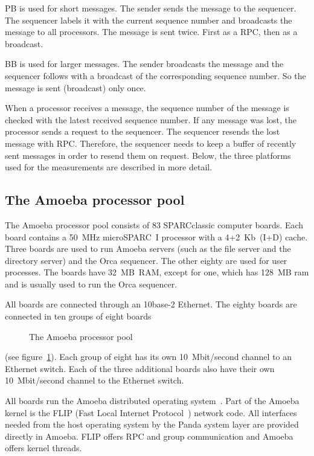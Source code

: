 \documentclass[a4paper,11pt]{article}
\begin{document}
PB is
used for short messages. The sender sends the message to the sequencer.
The sequencer labels it with the current sequence number and broadcasts
the message to all processors. The message is sent twice. First as a RPC,
then as a broadcast.

BB is used for larger messages. The sender broadcasts the message and
the sequencer follows with a broadcast of the corresponding sequence
number. So the message is sent (broadcast) only once.

When a processor receives a message, the
sequence number of the message
is checked with the latest received sequence number. If
any message was lost, the processor sends a request to the sequencer. The
sequencer resends the lost message with RPC.
Therefore, the sequencer needs to keep a buffer
of recently sent messages in order to resend them on request.
Below, the three platforms used for the measurements are described in more
detail.

\subsection{The Amoeba processor pool}
The Amoeba processor pool consists of 83 SPARCclassic computer
boards.
Each board contains a 50~MHz microSPARC~I processor with
a 4+2~Kb~(I+D) cache.
Three boards are used to run Amoeba servers (such as the file server and
the directory server)
and the Orca sequencer. The other eighty are used for user processes.
The boards have 32~MB~RAM, except for one,
which has 128~MB ram and is usually used to run the Orca sequencer.

All boards are connected through an 10base-2 Ethernet. The eighty boards
are connected in ten groups of eight boards
\begin{figure}[htbp]
\begin{center}
\caption{The Amoeba processor pool}
\label{fig:zoo-pool}
\end{center}
\end{figure}
(see figure~\ref{fig:zoo-pool}).
Each group of eight has its
own 10~Mbit/second channel to an Ethernet switch. Each of the three
additional boards also have their own 10~Mbit/second channel to the Ethernet
switch.

All boards run the Amoeba distributed operating system~\cite{amoeba}. Part
of the Amoeba kernel is the FLIP (Fast Local Internet Protocol~\cite{flip})
network code. All interfaces needed from the host operating system by
the Panda system layer are provided directly in Amoeba. FLIP offers RPC
and group communication and Amoeba offers kernel threads.
\end{document}
